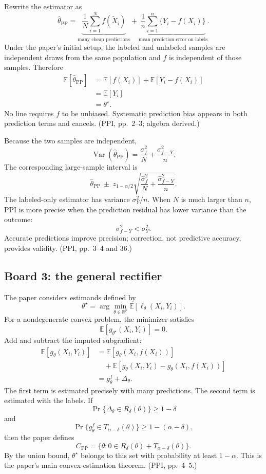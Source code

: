 \documentclass[11pt]{article}
\newcommand{\E}{\mathbb{E}}
\newcommand{\Var}{\operatorname{Var}}
\newcommand{\R}{\mathbb{R}}
\begin{document}
  Rewrite the estimator as
  \[
      \widehat\theta_{\mathrm{PP}}
      =
      \underbrace{\frac{1}{N}\sum_{i=1}^N f(\widetilde X_i)}
                  _{\text{many cheap predictions}}
      +
      \underbrace{\frac{1}{n}\sum_{i=1}^n\{Y_i-f(X_i)\}}
                  _{\text{mean prediction error on labels}}.
  \]
  Under the paper's initial setup, the labeled and unlabeled samples are
  independent draws from the same population and \(f\) is independent of those
  samples. Therefore
  \begin{align*}
      \E[\widehat\theta_{\mathrm{PP}}]
      &=
      \E[f(X_i)]+\E[Y_i-f(X_i)]\\
      &=
      \E[Y_i]\\
      &=\theta^\star.
  \end{align*}
  No line requires \(f\) to be unbiased. Systematic prediction bias appears in
  both prediction terms and cancels. (PPI, pp.~2--3; algebra derived.)
  
  Because the two samples are independent,
  \[
      \Var(\widehat\theta_{\mathrm{PP}})
      =
      \frac{\sigma_f^2}{N}
      +
      \frac{\sigma_{f-Y}^2}{n}.
  \]
  The corresponding large-sample interval is
  \[
      \widehat\theta_{\mathrm{PP}}
      \ \pm\
      z_{1-\alpha/2}
      \sqrt{\frac{\widehat\sigma_f^2}{N}
            +\frac{\widehat\sigma_{f-Y}^2}{n}}.
  \]
  The labeled-only estimator has variance \(\sigma_Y^2/n\). When \(N\) is much
  larger than \(n\), PPI is more precise when the prediction residual has lower
  variance than the outcome:
  \[
      \sigma_{f-Y}^2<\sigma_Y^2.
  \]
  Accurate predictions improve precision; correction, not predictive accuracy,
  provides validity. (PPI, pp.~3--4 and 36.)
  
  \subsection*{Board 3: the general rectifier}
  
  The paper considers estimands defined by
  \[
      \theta^\star
      =\arg\min_{\theta\in\R^p}\E[\ell_\theta(X_i,Y_i)].
  \]
  For a nondegenerate convex problem, the minimizer satisfies
  \[
      \E[g_{\theta^\star}(X_i,Y_i)]=0.
  \]
  Add and subtract the imputed subgradient:
  \begin{align*}
      \E[g_\theta(X_i,Y_i)]
      &=
      \E[g_\theta(X_i,f(X_i))]\\
      &\quad+
      \E[g_\theta(X_i,Y_i)-g_\theta(X_i,f(X_i))]\\
      &=g_\theta^f+\Delta_\theta.
  \end{align*}
  The first term is estimated precisely with many predictions. The second term is
  estimated with the labels. If
  \[
      \Pr\{\Delta_\theta\in R_\delta(\theta)\}\geq1-\delta
  \]
  and
  \[
      \Pr\{g_\theta^f\in T_{\alpha-\delta}(\theta)\}
      \geq1-(\alpha-\delta),
  \]
  then the paper defines
  \[
      C_{\mathrm{PP}}
      =
      \{\theta:0\in R_\delta(\theta)+T_{\alpha-\delta}(\theta)\}.
  \]
  By the union bound, \(\theta^\star\) belongs to this set with probability at
  least \(1-\alpha\). This is the paper's main convex-estimation theorem.
  (PPI, pp.~4--5.)
  
\end{document}
